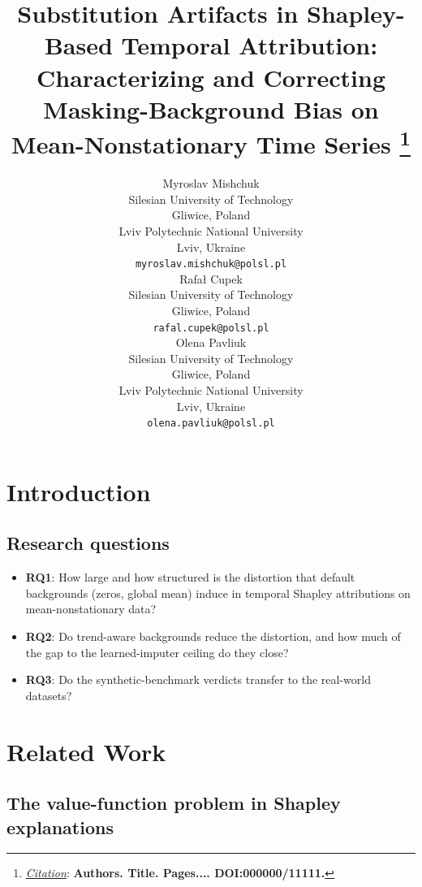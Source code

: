 \documentclass{article}
\title{Substitution Artifacts in Shapley-Based Temporal Attribution:
Characterizing and Correcting Masking-Background Bias on
Mean-Nonstationary Time Series
\thanks{\textit{\underline{Citation}}: 
\textbf{Authors. Title. Pages.... DOI:000000/11111.}} 
}
\author{
  Myroslav Mishchuk \\
  Silesian University of Technology \\ 
  Gliwice, Poland \\
  Lviv Polytechnic National University \\ 
  Lviv, Ukraine \\
  \texttt{myroslav.mishchuk@polsl.pl} \\
   \And
  Rafał Cupek \\
  Silesian University of Technology \\ 
  Gliwice, Poland\\
  \texttt{rafal.cupek@polsl.pl} \\
    \And
  Olena Pavliuk \\
  Silesian University of Technology \\ 
  Gliwice, Poland \\
  Lviv Polytechnic National University \\ 
  Lviv, Ukraine \\
  \texttt{olena.pavliuk@polsl.pl} \\
}
\begin{document}
\maketitle


\begin{abstract}
\lipsum[1]
\end{abstract}




\section{Introduction}
\label{sec:intro}

\subsection{Research questions}\label{sec:setup:rqs}
\begin{itemize}
    \item \textbf{RQ1}: How large and how structured is the distortion that default backgrounds (zeros, global mean) induce in temporal Shapley attributions on mean-nonstationary data?
    \item \textbf{RQ2}: Do trend-aware backgrounds reduce the distortion, and how much of the gap to the learned-imputer ceiling do they close? 
    \item \textbf{RQ3}: Do the synthetic-benchmark verdicts transfer to the real-world datasets?
\end{itemize}

\section{Related Work}
\label{sec:related}

\subsection{The value-function problem in Shapley explanations}
\label{sec:related:offmanifold}
\end{document}
